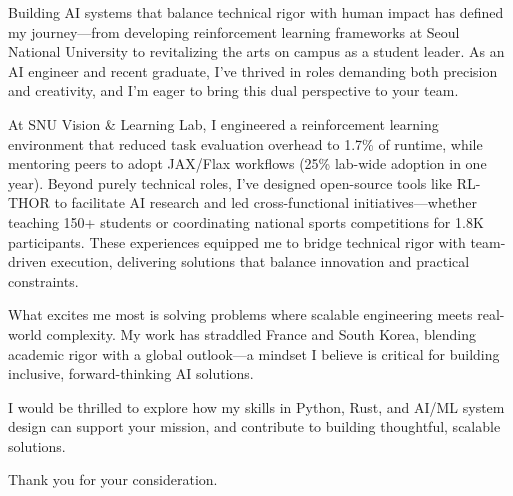 
\newcommand{\Company}{}
\recipient{\phantom{.}}{}
\date{}
\makelettertitle{}

Building AI systems that balance technical rigor with human impact has defined my journey—from developing reinforcement learning frameworks at Seoul National University to revitalizing the arts on campus as a student leader. As an AI engineer and recent graduate, I've thrived in roles demanding both precision and creativity, and I'm eager to bring this dual perspective to your team.


At SNU Vision \& Learning Lab, I engineered a reinforcement learning environment that reduced task evaluation overhead to 1.7\% of runtime, while mentoring peers to adopt JAX/Flax workflows (25\% lab-wide adoption in one year). Beyond purely technical roles, I've designed open-source tools like RL-THOR to facilitate AI research and led cross-functional initiatives—whether teaching 150+ students or coordinating national sports competitions for 1.8K participants. These experiences equipped me to bridge technical rigor with team-driven execution, delivering solutions that balance innovation and practical constraints.

What excites me most is solving problems where scalable engineering meets real-world complexity. My work has straddled France and South Korea, blending academic rigor with a global outlook—a mindset I believe is critical for building inclusive, forward-thinking AI solutions.

I would be thrilled to explore how my skills in Python, Rust, and AI/ML system design can support your mission, and contribute to building thoughtful, scalable solutions.

Thank you for your consideration.

\makeletterclosing
